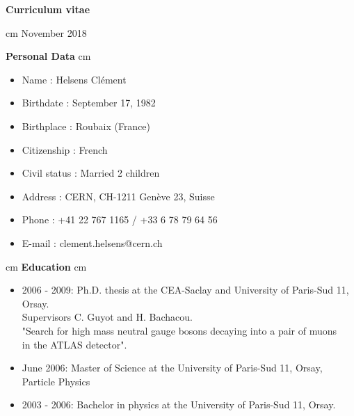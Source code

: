 \documentclass[12pt]{article}
\begin{document}






\begin{center}
\vskip 1cm
{\bf Curriculum vitae} \\
\end{center}
 cm November 2018
\vskip 1.8cm



{\bf \large Personal Data}
 cm
\TabPositions{2.5cm}
\begin{itemize}
\itemsep0em
\item[] Name \tab : Helsens Cl\'ement
\item[] Birthdate  \tab : September 17, 1982
\item[] Birthplace \tab :   Roubaix (France) 
\item[] Citizenship \tab :  French
\item[] Civil status \tab : Married 2 children
\item[] Address \tab : CERN, CH-1211 Gen\`eve 23, Suisse
\item[] Phone \tab : +41 22 767 1165  / +33 6 78 79 64 56
\item[] E-mail \tab : clement.helsens@cern.ch
\end{itemize}



 cm
{\bf \large Education}
 cm
\TabPositions{2.5cm}
\begin{itemize}
\itemsep0em
\item[] 2006 - 2009: \tab  Ph.D. thesis at the CEA-Saclay and University of Paris-Sud 11, Orsay. \\
\tab \tab Supervisors C. Guyot and H. Bachacou. \\
\tab \tab "Search for high mass neutral gauge bosons decaying into a pair of muons\\
\tab \tab in the ATLAS detector".
\item[]June 2006: \tab  Master of Science at the University of Paris-Sud 11, Orsay, \\
\tab \tab Particle Physics
\item[] 2003 - 2006:  \tab  Bachelor in physics at the University of Paris-Sud 11, Orsay.
\end{itemize}
\end{document}
